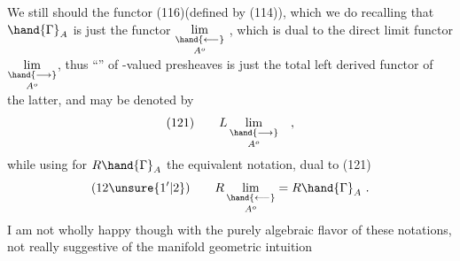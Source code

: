 We still should  the functor  (116)(defined by (114)), which
we do recalling that $\hand{\Gamma}_A$ is just the  functor $\underset{A^o}{\underset{\hand{\longleftarrow}}{\lim}}$ , which is dual to 
the direct limit functor $\underset{A^o}{\underset{\hand{\longrightarrow}}{\lim}}$, thus ``'' of -valued
presheaves is just  the total left derived functor of the latter, and
may be denoted by
\[ (121)\qquad L\,\underset{A^o}{\underset{\hand{\longrightarrow}}{\lim}} \quad , \]
while using for $R\hand{\Gamma}_A$ the equivalent notation, dual to (121)
\[ (12\unsure{1'|2})\qquad R\,\underset{A^o}{\underset{\hand{\longleftarrow}}{\lim}} = R\hand{\Gamma}_A \ . \]
I am not wholly happy though with the purely algebraic flavor of these
notations, not really suggestive of the manifold geometric intuition

